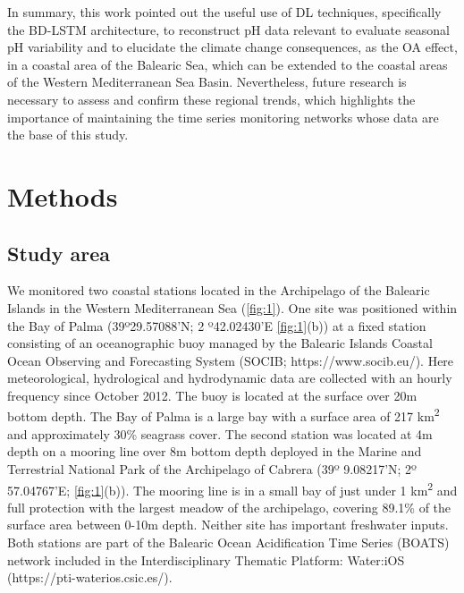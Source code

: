 In summary, this work pointed out the useful use of DL techniques,
specifically the BD-LSTM architecture, to reconstruct pH data relevant to
evaluate seasonal pH variability and to elucidate the climate change
consequences, as the OA effect, in a coastal area of the Balearic Sea, which
can be extended to the coastal areas of the Western Mediterranean Sea Basin.
Nevertheless, future research is necessary to assess and confirm these regional
trends, which highlights the importance of maintaining the time series
monitoring networks whose data are the base of this study.

\section{Methods}
\subsection*{Study area}
We monitored two coastal stations located in the Archipelago of the
Balearic Islands in the Western Mediterranean Sea (\cref{fig:1}). One site was
positioned within the Bay of Palma (39º29.57088’N; 2 º42.02430’E
\cref{fig:1}(b)) at a fixed station consisting of an oceanographic buoy managed
by the Balearic Islands Coastal Ocean Observing and Forecasting System (SOCIB;
https://www.socib.eu/). Here meteorological, hydrological and hydrodynamic data
are collected with an hourly frequency since October 2012. The buoy is located
at the surface over 20m bottom depth. The Bay of Palma is a large bay with a
surface area of 217 km\textsuperscript{2} and approximately 30\% seagrass
cover\cite{gazeau2005whole}. The second station was located at 4m depth on a
mooring line over 8m bottom depth deployed in the Marine and Terrestrial
National Park of the Archipelago of Cabrera (39º 9.08217’N; 2º 57.04767’E;
\cref{fig:1}(b)). The mooring line is in a small bay of just under 1
km\textsuperscript{2} and full protection with the largest meadow of the
archipelago, covering 89.1\% of the surface area between 0-10m
depth\cite{marba2002effectiveness}. Neither site has important freshwater
inputs. Both stations are part of the Balearic Ocean Acidification Time Series
(BOATS) network included in the Interdisciplinary Thematic Platform: Water:iOS
(https://pti-waterios.csic.es/).

